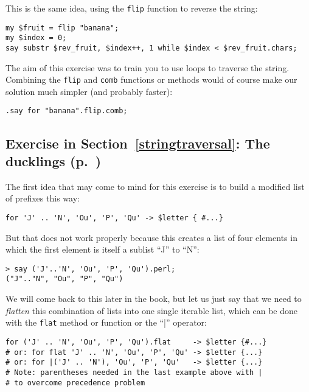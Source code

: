 This is the same idea, using the {\tt flip} function to 
reverse the string:

\begin{verbatim}
my $fruit = flip "banana";
my $index = 0;
say substr $rev_fruit, $index++, 1 while $index < $rev_fruit.chars;
\end{verbatim}
%

The aim of this exercise was to train you to use loops to 
traverse the string. Combining the {\tt flip} and {\tt comb} 
functions or methods would of course make our solution much 
simpler (and probably faster):

\begin{verbatim}
.say for "banana".flip.comb;
\end{verbatim}


\subsection{Exercise in Section~\ref{stringtraversal}: The ducklings (p.~\pageref{stringtraversal})}
\label{sol_ducklings}

The first idea that may come to mind for this exercise is to build 
a modified list of prefixes this way:

\begin{verbatim}
for 'J' .. 'N', 'Ou', 'P', 'Qu' -> $letter { #...}
\end{verbatim}
%

But that does not work properly because this creates a list 
of four elements in which the first element is itself a 
sublist ``J'' to ``N'':

\begin{verbatim}
> say ('J'..'N', 'Ou', 'P', 'Qu').perl;
("J".."N", "Ou", "P", "Qu")
\end{verbatim}
%

We will come back to this later in the book, but let us just say 
that we need to \emph{flatten} this combination of lists into 
one single iterable list, which can be done with the 
{\tt flat} method or function or the ``|'' operator:

\begin{verbatim}
for ('J' .. 'N', 'Ou', 'P', 'Qu').flat     -> $letter {#...}
# or: for flat 'J' .. 'N', 'Ou', 'P', 'Qu' -> $letter {...}
# or: for |('J' .. 'N'), 'Ou', 'P', 'Qu'   -> $letter {...}
# Note: parentheses needed in the last example above with | 
# to overcome precedence problem
\end{verbatim}
%

